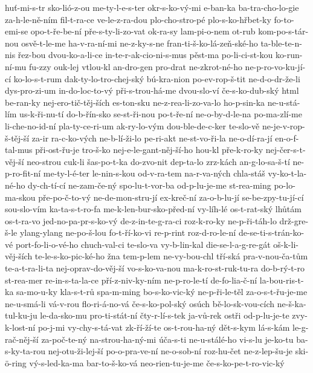 {huť-mi-s-tr
sko-lió-z-ou
me-ty-l-e-s-ter
okr-s-ko-vý-mi
e-ban-ka
ba-tra-cho-lo-gie
za-h-le-ně-ním
fil-t-ra-ce
ve-le-z-ra-dou
plo-cho-stro-pé
plo-s-ko-hřbet-ky
fo-to-emi-se
opo-t-ře-be-ní
pře-s-ty-li-zo-vat
ok-ra-sy
lam-pi-o-nem
ot-rub
kom-po-s-tár-nou
osvě-t-le-me
ha-v-ra-ní-mi
ne-z-ky-s-ne
fran-ti-š-ko-lá-zeň-ské-ho
ta-ble-te-n-nis
řez-bou
dvou-ko-a-li-ce
in-te-r-ak-cio-ni-s-mus
pěst-ma
po-li-ci-st-kou
ko-run-ní-mu
fu-zzy
ouk-lej
vtlou-kl
an-dro-gen
pro-drat
ne-zkrot-né-ho
ne-p-ro-vo-ku-jí-cí
ko-lo-s-t-rum
dak-ty-lo-tro-chej-ský
bú-kra-nion
po-ev-rop-š-tit
ne-d-o-dr-že-li
dys-pro-zi-um
in-do-loc-to-vý
při-s-trou-há-me
dvou-slo-ví
če-s-ko-dub-ský
html
be-ran-ky
nej-ero-tič-těj-ších
es-ton-sku
ne-z-rea-li-zo-va-lo
ho-p-sin-ka
ne-u-stá-lím
us-k-ři-nu-tí
do-b-řín-sko
se-st-ři-nou
po-t-ře-ní
ne-o-by-d-le-na
po-ma-zlí-me
li-che-no-id-ní
pla-ty-ce-ri-um
ak-ry-lo-vým
dou-ble-de-c-ker
te-slo-vě
ne-je-v-rop-š-těj-ší
za-ir
ra-c-ko-vých
ne-b-lí-ži-lo
pe-ri-akt
ne-st-vo-ři-la
ne-o-dí-ra-jí
en-o-f-tal-mus
při-ost-řu-je
tro-š-ko
nej-e-le-gant-něj-ší-ho
hou-kl
pře-k-ro-ky
nej-čer-s-t-věj-ší
neo-strou
cuk-li
šas-po-t-ka
do-zvo-nit
dep-ta-lo
zrz-kách
an-g-lo-sa-š-tí
ne-p-ro-fit-ní
me-ty-l-é-ter
le-nin-s-kou
od-v-ra-tem
na-r-va-ných
chla-stáš
vy-ko-t-la-né-ho
dy-ch-tí-cí
ne-zam-če-ný
spo-lu-t-vor-ba
od-p-lu-je-me
st-rea-ming
po-lo-ma-skou
pře-po-č-to-vý
ne-de-mon-stru-jí
ex-kreč-ní
za-o-b-lu-jí
se-be-zpy-tu-jí-cí
sou-slo-vím
ka-ta-s-t-ro-fa
me-k-len-bur-sko-před-ní
vy-líh-lé
os-t-rat-ský
lhůtám
os-t-ra-vo
jed-no-pa-pr-s-ko-vý
de-z-in-te-g-ra-ci
roz-k-ro-ky
ne-p-ři-táh-lo
drž-gre-š-le
ylang-ylang
ne-po-š-lou
fo-t-ří-ko-vi
re-p-rint
roz-d-ro-le-ní
de-se-ti-s-trán-ko-vé
port-fo-li-o-vé-ho
chuch-val-ci
te-slo-va
vy-b-lin-kal
die-se-l-a-g-re-gát
oš-k-li-věj-ších
te-le-s-ko-pic-ké-ho
žna
tem-p-lem
ne-vy-bou-chl
tří-ská
pra-v-nou-ča-tům
te-a-t-ra-li-ta
nej-oprav-do-věj-ší
vo-s-ko-va-nou
ma-k-ro-st-ruk-tu-ra
do-b-rý-t-ro
st-rea-mer
re-in-s-ta-la-ce
pří-z-niv-ky-ním
ne-p-ro-le-tí
de-fo-lia-č-ní
la-bou-ris-t-ka
sa-mo-u-ky
kla-s-t-rů
spa-m-ming
bo-s-ko-vic-ký
ne-p-ři-le-těl
za-o-s-t-řu-je-me
ne-u-smá-li
vá-v-rou
flo-ri-á-no-vá
če-s-ko-pol-ský
osúch
bě-lo-sk-vou-cích
ne-š-ka-tul-ku-ju
le-da-sko-mu
pro-ti-stát-ní
čty-r-lí-s-tek
ja-vů-rek
ostři
od-p-lu-je-te
zvy-k-lost-ní
po-j-mi
vy-chy-s-tá-vat
zk-ří-ží-te
os-t-rou-ha-ný
dět-s-kym
lá-s-kám
le-g-rač-něj-ší
za-poč-te-ný
na-strou-ha-ný-mi
úča-s-ti
ne-u-stálé-ho
vi-s-lu
je-ko-tu
ba-s-ky-ta-rou
nej-otu-ži-lej-ší
po-o-pra-ve-ní
ne-o-sob-ní
roz-hu-čet
ne-z-lep-šu-je
ski-ö-ring
vý-s-led-ka-ma
bar-to-š-ko-vá
neo-rien-tu-je-me
če-s-ko-pe-t-ro-vic-ký
}
